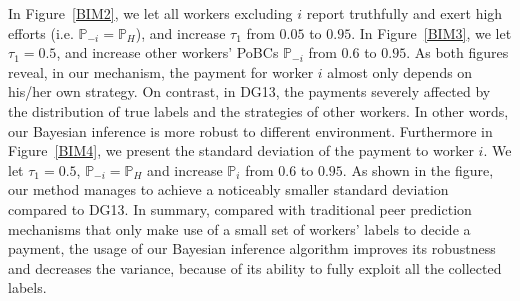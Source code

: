 In Figure~\ref{BIM2}, we let all workers excluding $i$ report truthfully and exert high efforts (i.e. $\mathbb{P}_{-i} = \mathbb{P}_H$), 
and increase $\tau_1$ from $0.05$ to $0.95$.
In Figure~\ref{BIM3}, we let $\tau_1=0.5$, and increase other workers' PoBCs $\mathbb{P}_{-i}$ from $0.6$ to $0.95$.
As both figures reveal, in our mechanism, the payment for worker $i$ almost only depends on his/her own strategy. On contrast, in DG13, the payments severely affected by the distribution of true labels and the strategies of other workers.
In other words, our Bayesian inference is more robust to different environment.
Furthermore in Figure~\ref{BIM4}, we present the standard deviation of the payment to worker $i$.
We let $\tau_1=0.5$, $\mathbb{P}_{-i}=\mathbb{P}_H$ and increase $\mathbb{P}_i$ from $0.6$ to $0.95$.
As shown in the figure, our method manages to achieve a noticeably smaller standard deviation compared to DG13. 
In summary, compared with traditional peer prediction mechanisms that only make use of a small set of workers' labels to decide a payment, the usage of our Bayesian inference algorithm improves its robustness and decreases the variance, because of its ability to fully exploit all the collected labels. %



